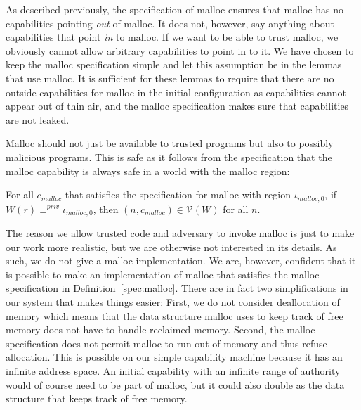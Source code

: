 \documentclass[format=acmsmall, review=true, screen=true]{acmart}
\newcommand{\var}[1]{\mathit{#1}}
\newcommand{\futurestr}{\mathbin{\sqsupseteq}^{\var{priv}}}
\newcommand{\codelabel}[1]{\mathit{#1}}
\newcommand{\malloc}{\codelabel{malloc}}
\newcommand{\asmType}{\plaindom{AsmType}}
\newcommand{\plaindom}[1]{\mathrm{#1}}
\newcommand{\intr}[2]{\mathcal{#1}}
\newcommand{\valueintr}[1]{\intr{V}{#1}}
\newcommand{\stdvr}{\valueintr{\asmType}}
\newcommand{\npair}[2][n]{\left(#1,#2 \right)}
\newenvironment{toplas}{}{}
\newcommand{\itoplassug}[1]{}
\begin{document}
\begin{toplas}
As described previously, the specification of malloc ensures that malloc has no
capabilities pointing \textit{out} of malloc. It does not, however, say anything
about capabilities that point \textit{in} to malloc. If we want to be able to
trust malloc, we obviously cannot allow arbitrary capabilities to point in to
it. We have chosen to keep the malloc specification simple and let this
assumption be in the lemmas that use malloc. It is sufficient for these lemmas
to require that there are no outside capabilities for malloc in the initial
configuration as capabilities cannot appear out of thin air, and the malloc
specification makes sure that capabilities are not leaked.

Malloc should not just be available to trusted programs but also to possibly
malicious programs. This is safe as it follows from the specification that the malloc
capability is always safe in a world with the malloc region:
\begin{lemma}
  \label{lem:malloc-in-vr}
  For all $c_\malloc$ that satisfies the specification for malloc with region $\iota_{\malloc,0}$,  if $W(r) \futurestr \iota_{\malloc,0}$, then
  $\npair{c_\malloc} \in \stdvr(W)$ for all $n$.
\end{lemma}

The reason we allow trusted code and adversary to invoke malloc is just to make
our work more realistic, but we are otherwise not interested in its details. As
such, we do not give a malloc implementation. We are, however, confident that it
is possible to make an implementation of malloc that satisfies the malloc
specification in Definition~\ref{spec:malloc}. There are in fact two
simplifications in our system that makes things easier: First, we do not consider
deallocation of memory which means that the data structure malloc uses to keep
track of free memory does not have to handle reclaimed memory. Second, the
malloc specification does not permit malloc to run out of memory and thus refuse
allocation. This is possible on our simple capability machine because it has an
infinite address space. An initial capability with an infinite range of
authority would of course need to be part of malloc, but it could also double as
the data structure that keeps track of free memory. %


\end{toplas}
\end{document}
